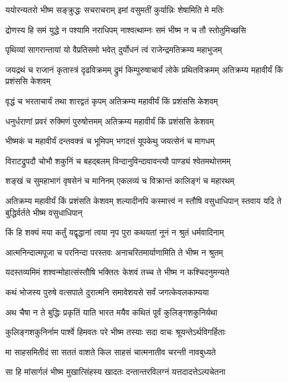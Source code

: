 \twolineshloka
{ययोरन्यतरो भीष्म सङ्क्रुद्धः सचराचराम्}
{इमां वसुमतीं कुर्यान्निः शेषामिति मे मतिः}


\twolineshloka
{द्रोणस्य हि समं युद्धे न पश्यामि नराधिपम्}
{नाश्वत्थाम्नः समं भीष्म न च तौ स्तोतुमिच्छसि}


\twolineshloka
{पृथिव्यां सागरान्तायां यो वैप्रतिसमो भवेत्}
{दुर्योधनं त्वं राजेन्द्रमतिक्रम्य महाभुजम्}


\threelineshloka
{जयद्रथं च राजानं कृतास्त्रं दृढविक्रमम्}
{द्रुमं किम्पुरुषाचार्यं लोके प्रथितविक्रमम्}
{अतिक्रम्य महावीर्यं किं प्रशंससि केशवम्}


\twolineshloka
{वृद्धं च भरताचार्यं तथा शारद्वतं कृपम्}
{अतिक्रम्य महावीर्यं किं प्रशंससि केशवम्}


\twolineshloka
{धनुर्धराणां प्रवरं रुक्मिणं पुरुषोत्तमम्}
{अतिक्रम्य महावीर्यं किं प्रशंससि केशवम्}


\twolineshloka
{भीष्मकं च महावीर्यं दन्तवक्त्रं च भूमिपम्}
{भगदत्तं यूपकेथु जयत्सेनं च मागधम्}


\twolineshloka
{विराटद्रुपदौ चोभौ शकुनिं च बहद्बलम्}
{विन्दानुविन्दावावन्त्यौ पाण्ड्यं श्वेतमथोत्तमम्}


\twolineshloka
{शङ्खं च सुमहाभागं वृषसेनं च मानिनम्}
{एकलव्यं च विक्रान्तं कालिङ्गं च महारथम्}


\fourlineindentedshloka
{अतिक्रम्य महावीर्यं किं प्रशंसति केशवम्}
{शल्यादीनपि कस्मात्त्वं न स्तौषि वसुधाधिपान्}
{स्तवाय यदि ते बुद्धिर्वर्तते भीष्म वसुधाधिपान्}
{}


\twolineshloka
{किं हि शक्यं मया कर्तुं यद्वृद्धानां त्वया नृप}
{पुरा कथयतां नूनं न श्रुतं धर्मवादिनाम्}


\twolineshloka
{आत्मनिन्दात्मपूजा च परनिन्दा परस्तवः}
{अनाचरितमार्याणामिति ते भीष्म न श्रुतम्}


\twolineshloka
{यदस्तव्यमिमं शश्वन्मोहात्संस्तौषि भक्तितः}
{केशवं तच्च ते भीष्म न कश्चिदनुमन्यते}


\twolineshloka
{कथं भोजस्य पुरुषे वत्सपाले दुरात्मनि}
{समावेशयसे सर्वं जगत्केवलकाम्यया}


\twolineshloka
{अथ चैषा न ते बुद्धिः प्रकृतिं याति भारत}
{मयैव कथितं पूर्वं कुलिङ्गशकुनिर्यथा}


\twolineshloka
{कुलिङ्गशकुनिर्नाम पार्श्वे हिमवतः परे}
{भीष्म तस्याः सदा वाचः श्रूयन्तेऽर्थविगर्हिताः}


\twolineshloka
{मा साहसमितीदं सा सततं वाशते किल}
{साहसं चात्मनातीव चरन्ती नावबुध्यते}


\twolineshloka
{सा हि मांसार्गलं भीष्म मुखात्सिंहस्य खादतः}
{दन्तान्तरविलग्नं यत्तदादत्तेऽल्पचेतना}


